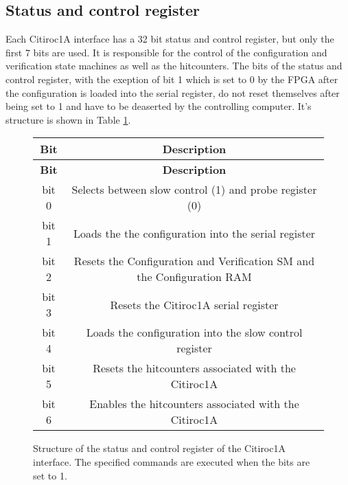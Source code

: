 \subsection{Status and control register}
Each Citiroc1A interface has a 32 bit status and control register, but only the first 7 bits are used.
 It is responsible for the control of the configuration and verification state machines as well as the hitcounters.
 The bits of the status and control register, with the exeption of bit 1 which is set to 0 by the FPGA after the configuration is loaded into the serial register,
do not reset themselves after being set to 1 and have to be deaserted by the controlling computer.
\newline
It's structure is shown in Table \ref{tab:status_control_register}.
\begin{figure}  
    \centering
\begin{longtable}{|c|c|}
    \hline
    \textbf{Bit} & \textbf{Description} \\
    \hline
    \endfirsthead
    
    \hline
    \textbf{Bit} & \textbf{Description} \\
    \hline
    \endhead
    
    \hline
    \endfoot
    
    \hline
    \endlastfoot
    bit 0 & Selects between slow control (1) and probe register (0) \\
    bit 1 & Loads the the configuration into the serial register\\
    bit 2 & Resets the Configuration and Verification SM and the Configuration RAM \\
    bit 3 & Resets the  Citiroc1A serial register \\
    bit 4 & Loads the configuration into the slow control register \\
    bit 5 & Resets the hitcounters associated with the Citiroc1A \\
    bit 6 & Enables the hitcounters associated with the Citiroc1A \\
    \hline
    \end{longtable}
    \caption{Structure of the status and control register of the Citiroc1A interface. 
    The specified commands are executed when the bits are set to 1. }  
    \label{tab:status_control_register}
\end{figure}  
  
